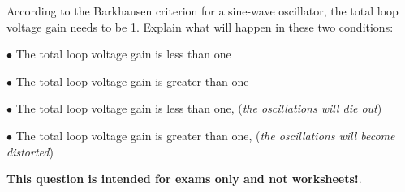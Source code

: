 

\goodbreak

According to the Barkhausen criterion for a sine-wave oscillator, the total loop voltage gain needs to be 1.  Explain what will happen in these two conditions:

\medskip
\item{$\bullet$} The total loop voltage gain is less than one
\item{$\bullet$} The total loop voltage gain is greater than one
\medskip







\medskip
\goodbreak
\item{$\bullet$} The total loop voltage gain is less than one, ({\it the oscillations will die out})
\item{$\bullet$} The total loop voltage gain is greater than one, ({\it the oscillations will become distorted})
\medskip







{\bf This question is intended for exams only and not worksheets!}.




